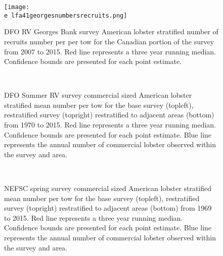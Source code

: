 \documentclass[11pt]{article}
\newcommand{\e}{/backup/bio_data/bio.lobster/figures/} %
\begin{document}
\begin{figure}

    \texttt{[image: \\e lfa41georgesnumbersrecruits.png]}
    \caption{DFO RV Georges Bank survey American lobster stratified number of recruits number per per tow for the Canadian portion of the survey from 2007 to 2015. Red line represents a three year running median. Confidence bounds are presented for each point estimate.}

\end{figure}



\begin{figure}
\centering
{}
\\
\caption{DFO Summer RV survey commercial sized American lobster stratified mean number per tow for the base survey (topleft), restratified survey (topright) restratified to adjacent areas (bottom) from 1970 to 2015. Red line represents a three year running median. Confidence bounds are presented for each point estimate. Blue line represents the annual number of commercial lobster observed within the survey and area.}
\end{figure}
\clearpage

\begin{figure}
\centering
{}
\\
\caption{NEFSC spring survey commercial sized American lobster stratified mean number per tow for the base survey (topleft), restratified survey (topright) restratified to adjacent areas (bottom) from 1969 to 2015. Red line represents a three year running median. Confidence bounds are presented for each point estimate. Blue line represents the annual number of commercial lobster observed within the survey and area.}
\end{figure}
\clearpage
\end{document}
